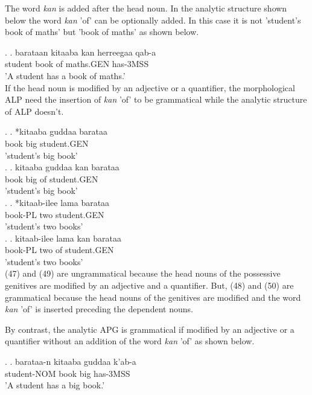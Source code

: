 \documentclass[11pt,a4paper]{article}
\begin{document}
	
	
	The word \emph{kan} is added after the head noun. In the analytic structure shown below the word \emph{kan} 'of' can be optionally added. In this case it is not 'student's book of maths' but 'book of maths' as shown below.
	
	\ex.
	\ag.
	barataan kitaaba kan herreegaa qab-a\\
	student book  of maths.GEN has-3MSS\\
	'A student has a book of maths.'\\
	
	If the head noun is modified by an adjective or a quantifier, the morphological ALP need the insertion of \emph{kan} 'of' to be grammatical while the analytic structure of ALP doesn't. 
	
	\ex.
	\ag.
	*kitaaba guddaa barataa\\
	book big student.GEN\\
	'student's big book'\\
	
	\ex.
	\ag.
	kitaaba guddaa kan barataa\\
	book big of student.GEN\\
	'student's big book'\\
	
	\ex.
	\ag.
	*kitaab-ilee lama barataa\\
	book-PL two student.GEN\\
	'student's two books'\\
	
	\ex.
	\ag.
	kitaab-ilee lama kan barataa\\
	book-PL two of student.GEN\\
	'student's two books'\\
	
	(47) and (49) are ungrammatical because the head nouns of the possessive genitives are modified by an adjective and a quantifier. But, (48) and (50) are grammatical because the head nouns of the genitives are modified and the word \emph{kan} 'of' is inserted preceding the dependent nouns. 
	
	By contrast, the analytic APG is grammatical if modified by an adjective or a quantifier without an addition of the word \emph{kan} 'of' as shown below.
	
	\ex.
	\ag.
	barataa-n kitaaba guddaa k'ab-a\\
	student-NOM book big has-3MSS\\
	'A student has a big book.'
	
\end{document}
